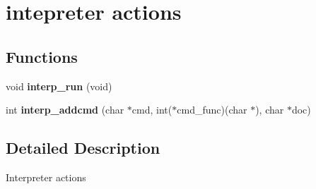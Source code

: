 \hypertarget{group__interpreter__actions}{\section{intepreter actions}
\label{group__interpreter__actions}
}
\subsection*{Functions}
\begin{DoxyCompactItemize}
\item 
\hypertarget{group__interpreter__actions_gad23a0577574ef808d5a2113d9ea9392a}{void {\bfseries interp\-\_\-run} (void)}\label{group__interpreter__actions_gad23a0577574ef808d5a2113d9ea9392a}

\item 
\hypertarget{group__interpreter__actions_ga0eea4afb5b4d7be37612d966080895ab}{int {\bfseries interp\-\_\-addcmd} (char $\ast$cmd, int($\ast$cmd\-\_\-func)(char $\ast$), char $\ast$doc)}\label{group__interpreter__actions_ga0eea4afb5b4d7be37612d966080895ab}

\end{DoxyCompactItemize}


\subsection{Detailed Description}
Interpreter actions 